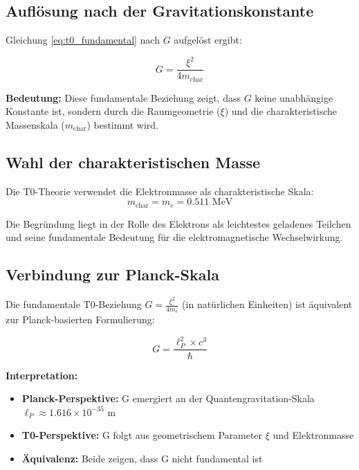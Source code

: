 	\subsection{Auflösung nach der Gravitationskonstante}
	
	Gleichung \eqref{eq:t0_fundamental} nach $G$ aufgelöst ergibt:
	
	\begin{equation}
		G = \frac{\xi^2}{4 m_{\text{char}}}
		\label{eq:g_fundamental}
	\end{equation}
	
	\textbf{Bedeutung:} Diese fundamentale Beziehung zeigt, dass $G$ keine unabhängige Konstante ist, sondern durch die Raumgeometrie ($\xi$) und die charakteristische Massenskala ($m_{\text{char}}$) bestimmt wird.
	
	\subsection{Wahl der charakteristischen Masse}
	
	Die T0-Theorie verwendet die Elektronmasse als charakteristische Skala:
	\begin{equation}
		m_{\text{char}} = m_e = 0.511 \text{ MeV}
		\label{eq:characteristic_mass}
	\end{equation}
	
	Die Begründung liegt in der Rolle des Elektrons als leichtestes geladenes Teilchen und seine fundamentale Bedeutung für die elektromagnetische Wechselwirkung.
	
	\subsection{Verbindung zur Planck-Skala}
	
	Die fundamentale T0-Beziehung $G = \frac{\xi^2}{4m_e}$ (in natürlichen Einheiten) ist äquivalent zur Planck-basierten Formulierung:
	
	\begin{equation}
		G = \frac{\ell_P^2 \times c^3}{\hbar}
	\end{equation}
	
	\textbf{Interpretation:}
	\begin{itemize}
		\item \textbf{Planck-Perspektive:} G emergiert an der Quantengravitation-Skala $\ell_P \approx 1.616 \times 10^{-35}$ m
		\item \textbf{T0-Perspektive:} G folgt aus geometrischem Parameter $\xi$ und Elektronmasse
		\item \textbf{Äquivalenz:} Beide zeigen, dass G nicht fundamental ist
	\end{itemize}
	
